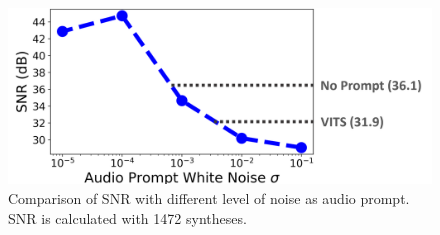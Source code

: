 \begin{figure}[!htb]
    \centering
    \includegraphics[width=\columnwidth]{imgs/SNR.png}
    \caption{Comparison of SNR with different level of noise as audio prompt. SNR is calculated with 1472 syntheses.}
    \label{fig:snr}
\end{figure}